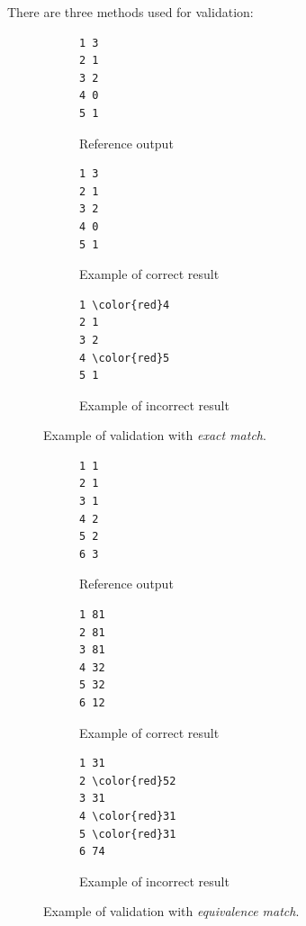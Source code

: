 There are three methods used for validation:

\begin{figure}[h]
\centering
\begin{subfigure}{0.3\textwidth}
\begin{Verbatim}[frame=single]
1 3
2 1
3 2
4 0
5 1
\end{Verbatim}
\caption{Reference output}
\end{subfigure}
\begin{subfigure}{0.3\textwidth}
\begin{Verbatim}[frame=single]
1 3
2 1
3 2
4 0
5 1
\end{Verbatim}
\caption{Example of correct result}
\end{subfigure}
\begin{subfigure}{0.3\textwidth}
\begin{Verbatim}[frame=single,commandchars=\\\{\}]
1 \color{red}4
2 1
3 2
4 \color{red}5
5 1
\end{Verbatim}
\caption{Example of incorrect result}
\end{subfigure}
\caption{Example of validation with \emph{exact match}.}
\label{fig:definition_validation_exact}
\end{figure}


\begin{figure}[h]
\centering
\begin{subfigure}{0.3\textwidth}
\begin{Verbatim}[frame=single]
1 1
2 1
3 1
4 2
5 2
6 3
\end{Verbatim}
\caption{Reference output}
\end{subfigure}
\begin{subfigure}{0.3\textwidth}
\begin{Verbatim}[frame=single]
1 81
2 81
3 81
4 32
5 32
6 12
\end{Verbatim}
\caption{Example of correct result}
\end{subfigure}
\begin{subfigure}{0.3\textwidth}
\begin{Verbatim}[frame=single,commandchars=\\\{\}]
1 31
2 \color{red}52
3 31
4 \color{red}31
5 \color{red}31
6 74
\end{Verbatim}
\caption{Example of incorrect result}
\end{subfigure}
\caption{Example of validation with \emph{equivalence match}.}
\label{fig:definition_validation_equivalence}
\end{figure}


